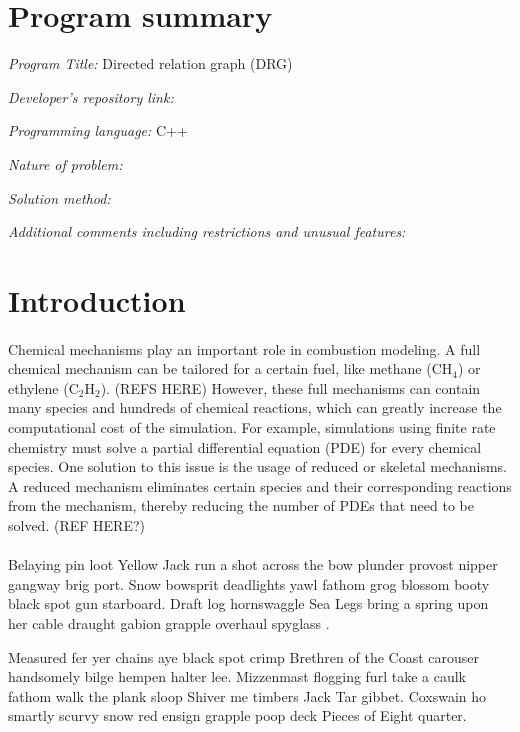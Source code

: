 \documentclass[review,3p]{elsarticle}
\begin{document}
\linenumbers
\section{Program summary}
\textit{Program Title:} Directed relation graph (DRG)
\par
\textit{Developer's repository link:} 
\par
\textit{Programming language:} C++
\par
\textit{Nature of problem:}
\par
\textit{Solution method:}
\par
\textit{Additional comments including restrictions and unusual features:}

\section{Introduction}      \label{sec:intro}
\paragraph{}
Chemical mechanisms play an important role in combustion modeling. A full chemical mechanism can be tailored for a certain fuel, like methane (CH$_4$) or ethylene (C$_2$H$_2$). (REFS HERE) However, these full mechanisms can contain many species and hundreds of chemical reactions, which can greatly increase the computational cost of the simulation. For example, simulations using finite rate chemistry must solve a partial differential equation (PDE) for every chemical species. One solution to this issue is the usage of reduced or skeletal mechanisms. A reduced mechanism eliminates certain species and their corresponding reactions from the mechanism, thereby reducing the number of PDEs that need to be solved. (REF HERE?) 
\paragraph{}
\lipsum[2]     %

Belaying pin loot Yellow Jack run a shot across the bow plunder provost nipper gangway brig port. Snow bowsprit deadlights yawl \cite{Lignell_2011} fathom grog blossom booty black spot gun starboard. Draft log hornswaggle Sea Legs bring a spring upon her cable draught gabion grapple overhaul spyglass \cite{Ferziger_2002, Cantera_new}.

Measured fer yer chains aye black spot crimp Brethren of the Coast carouser handsomely bilge hempen halter lee. Mizzenmast flogging furl take a caulk fathom walk the plank sloop Shiver me timbers Jack Tar gibbet. Coxswain ho smartly scurvy snow red ensign grapple poop deck Pieces of Eight quarter.
\end{document}
